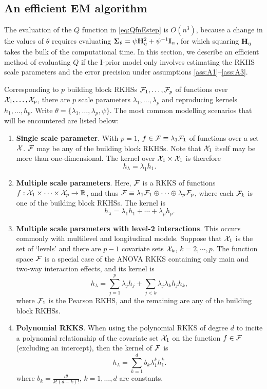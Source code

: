 \subsection{An efficient EM algorithm}
\label{sec:efficientEM1}

The evaluation of the $Q$ function in \eqref{eq:QfnEstep} is $O(n^3)$, because a change in the values of $\theta$ requires evaluating ${\bm\Sigma}_\theta = \psi{\mathbf H}_\eta^2 + \psi^{-1}{\mathbf I}_n$, for which squaring ${\mathbf H}_\eta$ takes the bulk of the computational time.
In this section, we describe an efficient method of evaluating $Q$ if the I-prior model only involves estimating the RKHS scale parameters and the error precision under assumptions \ref{ass:A1}--\ref{ass:A3}.

Corresponding to $p$ building block RKHSs ${\mathcal F}_1,\dots,{\mathcal F}_p$ of functions over ${\mathcal X}_1,\dots,{\mathcal X}_p$, there are $p$ scale parameters $\lambda_1,\dots,\lambda_p$ and reproducing kernels $h_1,\dots,h_p$.
Write $\theta = \{\lambda_1,\dots,\lambda_p,\psi\}$.
The most common modelling scenarios that will be encountered are listed below:
\begin{enumerate}
  \item \textbf{Single scale parameter}. With $p=1$, $f\in{\mathcal F}\equiv \lambda_1{\mathcal F}_1$ of functions over a set ${\mathcal X}$. ${\mathcal F}$ may be any of the building block RKHSs. Note that ${\mathcal X}_1$ itself may be more than one-dimensional. The kernel over ${\mathcal X}_1\times{\mathcal X}_1$ is therefore
  \[
    h_\lambda = \lambda_1 h_1.
  \]
  \item \textbf{Multiple scale parameters}. Here, ${\mathcal F}$ is a RKKS of functions $f:{\mathcal X}_1\times\cdots\times{\mathcal X}_p\to\mathbb{R}$, and thus ${\mathcal F}\equiv \lambda_1{\mathcal F}_1 \oplus \cdots \oplus \lambda_p{\mathcal F}_p$, where each ${\mathcal F}_k$ is one of the building block RKHSs. The kernel is
  \[
    h_\lambda = \lambda_1 h_1 + \cdots + \lambda_p h_p.
  \]
  \item \textbf{Multiple scale parameters with level-2 interactions}. This occurs commonly with multilevel and longitudinal models. Suppose that ${\mathcal X}_1$ is the set of `levels' and there are $p-1$ covariate sets ${\mathcal X}_k$, $k=2,\cdots,p$. The function space ${\mathcal F}$ is a special case of the ANOVA RKKS containing only main and two-way interaction effects, and its kernel is
  \[
    h_\lambda = \sum_{j=1}^p \lambda_j h_j + \sum_{j < k} \lambda_j\lambda_k h_j h_k,
  \]
  where ${\mathcal F}_1$ is the Pearson RKHS, and the remaining are any of the building block RKHSs.
  \item \textbf{Polynomial RKKS}. When using the polynomial RKKS of degree $d$ to incite a polynomial relationship of the covariate set ${\mathcal X}_1$ on the function $f\in{\mathcal F}$ (excluding an intercept), then the kernel of ${\mathcal F}$ is
  \[
    h_\lambda = \sum_{k=1}^d b_k \lambda_1^k h_1^k.
  \]
  where $b_k = \frac{d!}{k!(d-k)!}$, $k=1,\dots,d$ are constants.
\end{enumerate}
